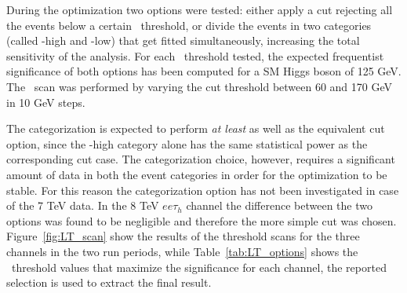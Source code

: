 During the optimization two options were tested: either apply a cut rejecting all the events below a certain \LT\ threshold, or divide the events in two categories (called \LT-high and \LT-low) that get fitted simultaneously, increasing the total sensitivity of the analysis. 
For each \LT \ threshold tested, the expected frequentist significance of both options has been computed for a SM Higgs boson of 125 GeV. The \LT\ scan was performed by varying the cut threshold between 60 and 170 GeV in 10 GeV steps. 

The categorization is expected to perform \emph{at least} as well as the equivalent cut option, since the \LT-high category alone has the same statistical power as the corresponding cut case. The categorization choice, however, requires a significant amount of data in both the event categories in order for the optimization to be stable. For this reason the categorization option has not been investigated in case of the 7 TeV data. In the 8 TeV $ee\tau_h$ channel the difference between the two options was found to be negligible and therefore the more simple cut was chosen. Figure~\ref{fig:LT_scan} show the results of the threshold scans for the three channels in the two run periods, while Table~\ref{tab:LT_options} shows the \LT\ threshold values that maximize the significance for each channel, the reported selection is used to extract the final result.

